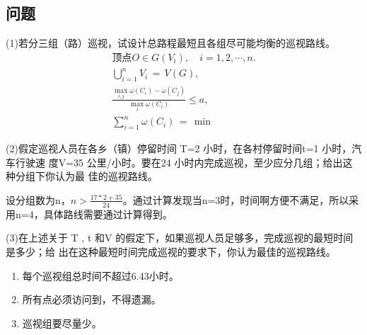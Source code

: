 \subsection{问题}
(1)若分三组（路）巡视，试设计总路程最短且各组尽可能均衡的巡视路线。
\begin{align*}
\text{顶点}O\in G(V_i),\quad i=1,2,\cdots,n. \\
\bigcup_{i=1}^nV_i\,=\,V(G), \\
\frac{\max_{i,j}\omega(C_i)-\omega(C_j)}{\max_i\omega(C_i)}\leq a, \\
\sum_{i=1}^n\omega(C_i)\,=\,\min
\end{align*}

(2)假定巡视人员在各乡（镇）停留时间 T=2 小时，在各村停留时间t=1 小时，汽车行驶速
度V=35 公里/小时。要在24 小时内完成巡视，至少应分几组；给出这种分组下你认为最
佳的巡视路线。\par
设分组数为n，$n>\frac{17*2+35}{24}$。通过计算发现当n=3时，时间啊方便不满足，所以采用n=4，具体路线需要通过计算得到。

(3)在上述关于 T , t 和V 的假定下，如果巡视人员足够多，完成巡视的最短时间是多少；给
出在这种最短时间完成巡视的要求下，你认为最佳的巡视路线。\par
\begin{enumerate}[(1)]
\item 每个巡视组总时间不超过6.43小时。
\item 所有点必须访问到，不得遗漏。
\item 巡视组要尽量少。
\end{enumerate}